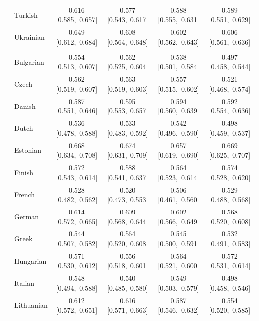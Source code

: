 \begin{longtable}[t]{llcccc}
 & Turkish & 0.616 [0.585,~0.657] & 0.577 [0.543,~0.617] & 0.588 [0.555,~0.631] & 0.589 [0.551,~0.629]\\

 & Ukrainian & 0.649 [0.612,~0.684] & 0.608 [0.564,~0.648] & 0.602 [0.562,~0.643] & 0.606 [0.561,~0.636]\\

\addlinespace[3pt]
\multicolumn{6}{p{\linewidth}}{\cellcolor[HTML]{DCDCDC}{classify the stance expressed in quasi-sentence}}\\
\addlinespace & Bulgarian & 0.554 [0.513,~0.607] & 0.562 [0.525,~0.604] & 0.538 [0.501,~0.584] & 0.497 [0.458,~0.544]\\

 & Czech & 0.562 [0.519,~0.607] & 0.563 [0.519,~0.603] & 0.557 [0.515,~0.602] & 0.521 [0.468,~0.574]\\

 & Danish & 0.587 [0.551,~0.646] & 0.595 [0.553,~0.657] & 0.594 [0.560,~0.639] & 0.592 [0.554,~0.636]\\

 & Dutch & 0.536 [0.478,~0.588] & 0.533 [0.483,~0.592] & 0.542 [0.496,~0.590] & 0.498 [0.459,~0.537]\\

 & Estonian & 0.668 [0.634,~0.708] & 0.674 [0.631,~0.709] & 0.657 [0.619,~0.690] & 0.669 [0.625,~0.707]\\

 & Finish & 0.572 [0.543,~0.614] & 0.588 [0.541,~0.637] & 0.564 [0.523,~0.614] & 0.574 [0.528,~0.620]\\

 & French & 0.528 [0.482,~0.562] & 0.520 [0.473,~0.553] & 0.506 [0.461,~0.560] & 0.529 [0.488,~0.568]\\

 & German & 0.614 [0.572,~0.665] & 0.609 [0.568,~0.644] & 0.602 [0.566,~0.649] & 0.568 [0.520,~0.608]\\

 & Greek & 0.544 [0.507,~0.582] & 0.564 [0.520,~0.608] & 0.545 [0.500,~0.591] & 0.532 [0.491,~0.583]\\

 & Hungarian & 0.571 [0.530,~0.612] & 0.556 [0.518,~0.601] & 0.564 [0.521,~0.600] & 0.572 [0.531,~0.614]\\

 & Italian & 0.548 [0.494,~0.588] & 0.540 [0.485,~0.580] & 0.549 [0.503,~0.579] & 0.498 [0.458,~0.546]\\

 & Lithuanian & 0.612 [0.572,~0.651] & 0.616 [0.571,~0.663] & 0.587 [0.546,~0.632] & 0.554 [0.520,~0.585]\\


\end{longtable}
